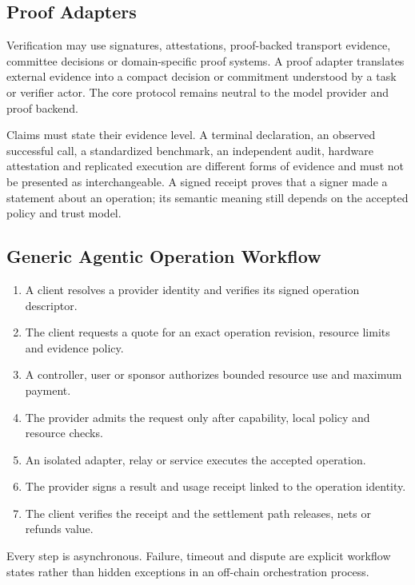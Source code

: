 \documentclass[11pt,oneside]{article}
\begin{document}
\subsection{Proof Adapters}

Verification may use signatures, attestations, proof-backed transport evidence, committee
decisions or domain-specific proof systems. A proof adapter translates external evidence into
a compact decision or commitment understood by a task or verifier actor. The core protocol
remains neutral to the model provider and proof backend.

Claims must state their evidence level. A terminal declaration, an observed successful call,
a standardized benchmark, an independent audit, hardware attestation and replicated execution
are different forms of evidence and must not be presented as interchangeable. A signed
receipt proves that a signer made a statement about an operation; its semantic meaning still
depends on the accepted policy and trust model.

\subsection{Generic Agentic Operation Workflow}

\begin{enumerate}
  \item A client resolves a provider identity and verifies its signed operation descriptor.
  \item The client requests a quote for an exact operation revision, resource limits and
        evidence policy.
  \item A controller, user or sponsor authorizes bounded resource use and maximum payment.
  \item The provider admits the request only after capability, local policy and resource
        checks.
  \item An isolated adapter, relay or service executes the accepted operation.
  \item The provider signs a result and usage receipt linked to the operation identity.
  \item The client verifies the receipt and the settlement path releases, nets or refunds
        value.
\end{enumerate}

Every step is asynchronous. Failure, timeout and dispute are explicit workflow states rather
than hidden exceptions in an off-chain orchestration process.
\end{document}
